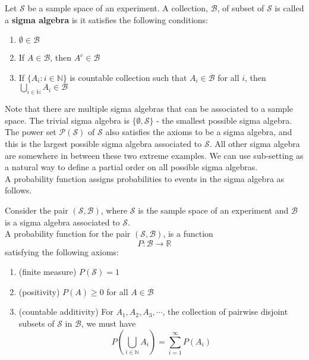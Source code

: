 \begin{defn}
Let $\mathcal{S}$ be a sample space of an experiment. A collection, $\mathcal{B}$, of subset of $\mathcal{S}$ is called a \textbf{sigma algebra} is it satisfies the following conditions:
\begin{enumerate}
    \item $\emptyset \in \mathcal{B}$
    \item If $A \in \mathcal{B}$, then $A^c \in \mathcal{B}$
    \item If $\{A_i: i \in \mathbb{N}\}$ is countable collection such that $A_i \in \mathcal{B}$ for all $i$, then $\bigcup_{i\in \mathbb{N}}A_i \in \mathcal{B}$
\end{enumerate}
\end{defn}
Note that there are multiple sigma algebras that can be associated to a sample space. The trivial sigma algebra is $\{\emptyset, \mathcal{S}\}$ - the smallest possible sigma algebra. The power set $\mathcal{P}(\mathcal{S})$ of $\mathcal{S}$ also satisfies the axioms to be a sigma algebra, and this is the largest possible sigma algebra associated to $\mathcal{S}$. All other sigma algebra are somewhere in between these two extreme examples. We can use sub-setting as a natural way to define a partial order on all possible sigma algebras. 
\\

A probability function assigns probabilities to events in the sigma algebra as follows.

\begin{defn}
    Consider the pair $(\mathcal{S}, \mathcal{B})$, where $\mathcal{S}$ is the sample space of an experiment and $\mathcal{B}$ is a sigma algebra associated to $\mathcal{S}$. 
    \\
    A probability function for the pair $(\mathcal{S}, \mathcal{B})$, is a function 
    $$P: \mathcal{B} \longrightarrow \mathbb{R}$$
    satisfying the following axioms:
    \begin{enumerate}
    \item (finite measure) $P(\mathcal{S})=1$
    \item (positivity) $P(A)\geq 0$ for all $A \in \mathcal{B}$
    \item (countable additivity) For $A_1,A_2,A_3,\cdots$, the collection of pairwise disjoint subsets of $\mathcal{S}$ in $\mathcal{B}$, we must have
    $$P\left(\bigcup_{i\in \mathbb{N}}A_i\right)=\sum_{i=1}^{\infty}P(A_i)$$ 
    \end{enumerate}  
\end{defn}

